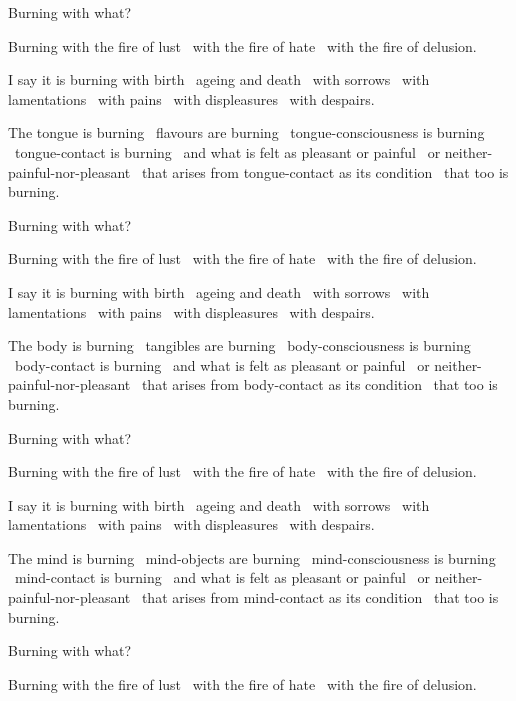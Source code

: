 Burning with what?

Burning with the fire of lust \breathmark\ with the fire of hate \breathmark\ with the fire of delusion.

I say it is burning with birth \breathmark\ ageing and death \breathmark\ with sorrows \breathmark\ with lamentations \breathmark\ with pains \breathmark\ with displeasures \breathmark\ with despairs.

The tongue is burning \breathmark\ flavours are burning \breathmark\ tongue-consciousness is burning \breathmark\ tongue-contact is burning \breathmark\ and what is felt as pleasant or painful \breathmark\ or neither-painful-nor-pleasant \breathmark\ that arises from tongue-contact as its condition \breathmark\ that too is burning.

Burning with what?

Burning with the fire of lust \breathmark\ with the fire of hate \breathmark\ with the fire of delusion.

I say it is burning with birth \breathmark\ ageing and death \breathmark\ with sorrows \breathmark\ with lamentations \breathmark\ with pains \breathmark\ with displeasures \breathmark\ with despairs.

The body is burning \breathmark\ tangibles are burning \breathmark\ body-consciousness is burning \breathmark\ body-contact is burning \breathmark\ and what is felt as pleasant or painful \breathmark\ or neither-painful-nor-pleasant \breathmark\ that arises from body-contact as its condition \breathmark\ that too is burning.

Burning with what?

Burning with the fire of lust \breathmark\ with the fire of hate \breathmark\ with the fire of delusion.

I say it is burning with birth \breathmark\ ageing and death \breathmark\ with sorrows \breathmark\ with lamentations \breathmark\ with pains \breathmark\ with displeasures \breathmark\ with despairs.

The mind is burning \breathmark\ mind-objects are burning \breathmark\ mind-consciousness is burning \breathmark\ mind-contact is burning \breathmark\ and what is felt as pleasant or painful \breathmark\ or neither-painful-nor-pleasant \breathmark\ that arises from mind-contact as its condition \breathmark\ that too is burning.

Burning with what?

Burning with the fire of lust \breathmark\ with the fire of hate \breathmark\ with the fire of delusion.

